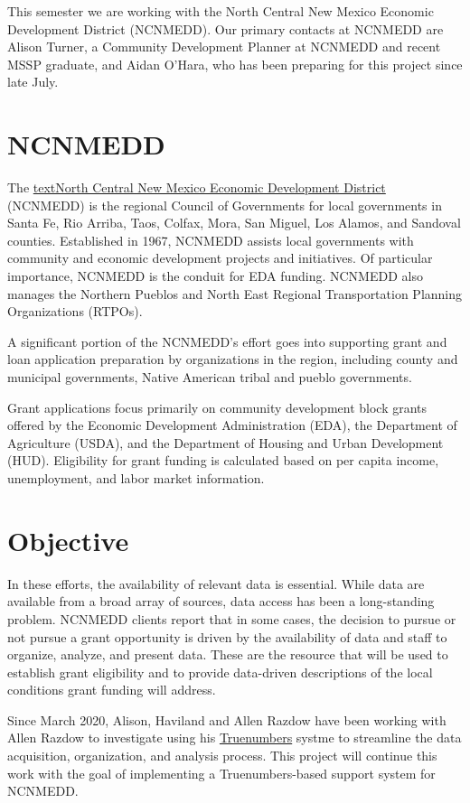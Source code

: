 \documentclass[11pt,letterpaper]{article}
\begin{document}
This semester we are working with the North Central New Mexico Economic 
Development District (NCNMEDD).  Our primary contacts at NCNMEDD are Alison 
Turner,  a Community Development Planner at NCNMEDD and recent MSSP graduate, 
and Aidan O'Hara, who has been preparing for this project since late July.


\section*{NCNMEDD}


The \href{https://www.ncnmedd.com/}{textNorth Central New Mexico Economic 
Development District} (NCNMEDD) is the 
regional Council of Governments for local governments in Santa Fe, Rio Arriba, 
Taos, Colfax, Mora, San Miguel, Los Alamos, and Sandoval counties. 
Established 
in 1967, NCNMEDD assists local governments with community and economic 
development projects and initiatives.  Of particular importance, NCNMEDD is the 
conduit for EDA funding.  NCNMEDD also manages the Northern Pueblos and North 
East Regional Transportation Planning Organizations (RTPOs). 



A significant portion of the NCNMEDD's effort goes into supporting grant and 
loan application preparation by organizations in the region, including county 
and municipal governments, Native American 
 tribal and pueblo governments.

Grant applications focus primarily on community development block grants 
offered by the Economic Development Administration (EDA), the Department of 
Agriculture (USDA), and the Department of Housing and Urban Development (HUD).  
Eligibility for grant funding is  calculated based on per capita income, 
unemployment, and labor market 
 information.  
 
 
\section*{Objective}

 
 In these efforts, the availability of relevant data is essential.  While data 
 are available from a broad array of sources, data access has been a 
 long-standing problem.   NCNMEDD clients report that in some cases, the 
 decision to pursue or not pursue a grant opportunity is driven by the 
 availability of data and staff to organize, analyze, and present data.  These 
 are the resource that will be used to establish grant eligibility and to 
 provide data-driven descriptions of the local conditions grant funding will 
 address.
 
 
 Since March 2020, Alison, Haviland and Allen Razdow have been working with 
 Allen Razdow to investigate using his \href{https://truenum.com/}{Truenumbers} 
 systme to streamline the data acquisition, organization, and analysis process.
 This project will continue this work with the goal of implementing a 
 Truenumbers-based support system for NCNMEDD.
 
 
 
\end{document}
